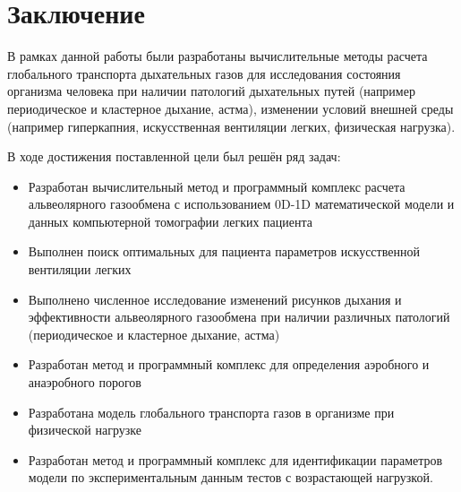 \chapter*{Заключение}						%

В рамках данной работы были разработаны вычислительные методы расчета глобального транспорта дыхательных газов для исследования состояния организма человека при наличии патологий дыхательных путей (например периодическое и кластерное дыхание, астма), изменении условий внешней среды (например гиперкапния, искусственная вентиляции легких, физическая нагрузка).

В ходе достижения поставленной цели был решён ряд задач:

\begin{itemize}
\item
Разработан вычислительный метод и программный комплекс расчета альвеолярного газообмена с использованием 0D-1D математической модели и данных компьютерной томографии легких пациента  
\item
Выполнен поиск оптимальных для пациента параметров искусственной вентиляции легких
\item
Выполнено численное исследование изменений рисунков дыхания и эффективности альвеолярного газообмена при наличии различных патологий (периодическое и кластерное дыхание, астма)
\item
Разработан метод и программный комплекс для определения аэробного и анаэробного порогов
\item
Разработана модель глобального транспорта газов в организме при физической нагрузке
\item
Разработан метод и программный комплекс для идентификации параметров модели по экспериментальным данным тестов с возрастающей нагрузкой.
\end{itemize}

\clearpage